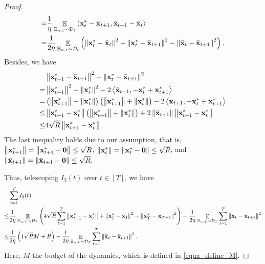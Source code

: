 \documentclass{article}
\begin{document}
\begin{proof}
\begin{align}
= & \frac{1}{\eta}\mathop{\mathbb{E}}_{ \Xi_{n,t} \sim \mathcal{D}_{t} }\left\langle {\bf x}_t^\ast - \bar{{\bf x}}_{t+1}, \bar{{\bf x}}_{t+1} - \bar{{\bf x}}_t  \right\rangle \\ \label{equa_I3_temp}
= & \frac{1}{2\eta}\mathop{\mathbb{E}}_{ \Xi_{n,t} \sim \mathcal{D}_{t} }\left(  \left\lVert{\bf x}_t^\ast - \bar{{\bf x}}_t\right\rVert^2 - \left\lVert{\bf x}_t^\ast - \bar{{\bf x}}_{t+1}\right\rVert^2 - \left\lVert\bar{{\bf x}}_t - \bar{{\bf x}}_{t+1}\right\rVert^2  \right). 
\end{align} Besides, we have
\begin{align}
\nonumber
& \left\lVert{\bf x}_{t+1}^\ast - \bar{{\bf x}}_{t+1}\right\rVert^2 - \left\lVert{\bf x}_t^\ast - \bar{{\bf x}}_{t+1}\right\rVert^2 \\ \nonumber 
= & \left\lVert{\bf x}_{t+1}^\ast\right\rVert^2 - \left\lVert{\bf x}_t^\ast\right\rVert^2 - 2\left\langle\bar{{\bf x}}_{t+1}, -{\bf x}_t^\ast + {\bf x}_{t+1}^\ast \right\rangle \\ \nonumber
= & \left( \left\lVert{\bf x}_{t+1}^\ast\right\rVert - \left\lVert{\bf x}_t^\ast\right\rVert \right) \left( \left\lVert{\bf x}_{t+1}^\ast\right\rVert + \left\lVert{\bf x}_t^\ast\right\rVert \right) - 2\left\langle\bar{{\bf x}}_{t+1}, -{\bf x}_t^\ast + {\bf x}_{t+1}^\ast \right\rangle \\ \nonumber
\le & \left\lVert{\bf x}_{t+1}^\ast - {\bf x}_t^\ast\right\rVert \left( \left\lVert{\bf x}_{t+1}^\ast\right\rVert + \left\lVert{\bf x}_t^\ast\right\rVert \right) + 2\left\lVert\bar{{\bf x}}_{t+1}\right\rVert \left\lVert{\bf x}_{t+1}^\ast-{\bf x}_t^\ast\right\rVert \\ \nonumber
\le & 4\sqrt{R}\left\lVert{\bf x}_{t+1}^\ast - {\bf x}_t^\ast\right\rVert.   
\end{align} The last inequality holds due to our assumption, that is, $\left\lVert{\bf x}_{t+1}^\ast\right\rVert=\left\lVert{\bf x}_{t+1}^\ast - {\bf 0}\right\rVert\le \sqrt{R}$, $\left\lVert{\bf x}_t^\ast\right\rVert = \left\lVert{\bf x}_t^\ast-{\bf 0}\right\rVert \le \sqrt{R}$, and $\left\lVert\bar{{\bf x}}_{t+1}\right\rVert = \left\lVert\bar{{\bf x}}_{t+1}-{\bf 0}\right\rVert \le \sqrt{R}$. 

Thus, telescoping $I_3(t)$ over $t\in[T]$, we have 
\begin{align}
\nonumber
& \sum_{t=1}^T I_3(t) \\ \nonumber 
\le & \frac{1}{2\eta}\mathop{\mathbb{E}}_{ \Xi_{n,T} \sim \mathcal{D}_{T} }\left(  4\sqrt{R}\sum_{t=1}^T\left\lVert{\bf x}_{t+1}^\ast - {\bf x}_t^\ast\right\rVert + \left\lVert\bar{{\bf x}}_1^\ast - \bar{{\bf x}}_1\right\rVert^2 - \left\lVert\bar{{\bf x}}_T^\ast - \bar{{\bf x}}_{T+1}\right\rVert^2  \right) - \frac{1}{2\eta} \mathop{\mathbb{E}}_{ \Xi_{n,T} \sim \mathcal{D}_{T} }\sum_{t=1}^T \left\lVert\bar{{\bf x}}_t - \bar{{\bf x}}_{t+1}\right\rVert^2 \\ \nonumber
\le & \frac{1}{2\eta}\left(  4\sqrt{R} M + R  \right) - \frac{1}{2\eta} \mathop{\mathbb{E}}_{ \Xi_{n,T} \sim \mathcal{D}_{T} } \sum_{t=1}^T \left\lVert\bar{{\bf x}}_t - \bar{{\bf x}}_{t+1} \right\rVert^2.
\end{align} Here, $M$ the budget of the dynamics, which is defined in \eqref{equa_define_M}.



\end{proof}
\end{document}
